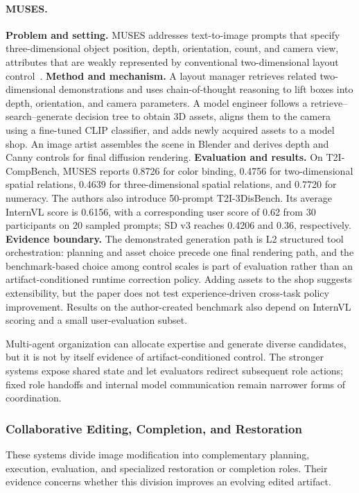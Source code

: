 \paragraph{MUSES.}
\textbf{Problem and setting.} MUSES addresses text-to-image prompts that specify three-dimensional object position, depth, orientation, count, and camera view, attributes that are weakly represented by conventional two-dimensional layout control~\cite{ding2025muses}. \textbf{Method and mechanism.} A layout manager retrieves related two-dimensional demonstrations and uses chain-of-thought reasoning to lift boxes into depth, orientation, and camera parameters. A model engineer follows a retrieve--search--generate decision tree to obtain 3D assets, aligns them to the camera using a fine-tuned CLIP classifier, and adds newly acquired assets to a model shop. An image artist assembles the scene in Blender and derives depth and Canny controls for final diffusion rendering. \textbf{Evaluation and results.} On T2I-CompBench, MUSES reports 0.8726 for color binding, 0.4756 for two-dimensional spatial relations, 0.4639 for three-dimensional spatial relations, and 0.7720 for numeracy. The authors also introduce 50-prompt T2I-3DisBench. Its average InternVL score is 0.6156, with a corresponding user score of 0.62 from 30 participants on 20 sampled prompts; SD v3 reaches 0.4206 and 0.36, respectively. \textbf{Evidence boundary.} The demonstrated generation path is L2 structured tool orchestration: planning and asset choice precede one final rendering path, and the benchmark-based choice among control scales is part of evaluation rather than an artifact-conditioned runtime correction policy. Adding assets to the shop suggests extensibility, but the paper does not test experience-driven cross-task policy improvement. Results on the author-created benchmark also depend on InternVL scoring and a small user-evaluation subset.

Multi-agent organization can allocate expertise and generate diverse candidates, but it is not by itself evidence of artifact-conditioned control. The stronger systems expose shared state and let evaluators redirect subsequent role actions; fixed role handoffs and internal model communication remain narrower forms of coordination.

\subsubsection{Collaborative Editing, Completion, and Restoration}
These systems divide image modification into complementary planning, execution, evaluation, and specialized restoration or completion roles. Their evidence concerns whether this division improves an evolving edited artifact.

